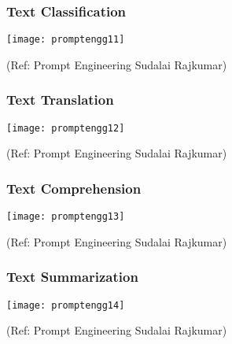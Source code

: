 \begin{frame}[fragile]\frametitle{Text Classification}

\begin{center}
\texttt{[image: promptengg11]}

{\tiny (Ref: Prompt Engineering Sudalai Rajkumar)}

\end{center}		
		


\end{frame}

\begin{frame}[fragile]\frametitle{Text Translation}

\begin{center}
\texttt{[image: promptengg12]}

{\tiny (Ref: Prompt Engineering Sudalai Rajkumar)}

\end{center}		
		


\end{frame}

\begin{frame}[fragile]\frametitle{Text Comprehension}

\begin{center}
\texttt{[image: promptengg13]}

{\tiny (Ref: Prompt Engineering Sudalai Rajkumar)}

\end{center}		
		


\end{frame}

\begin{frame}[fragile]\frametitle{Text Summarization}

\begin{center}
\texttt{[image: promptengg14]}

{\tiny (Ref: Prompt Engineering Sudalai Rajkumar)}

\end{center}		
		


\end{frame}


